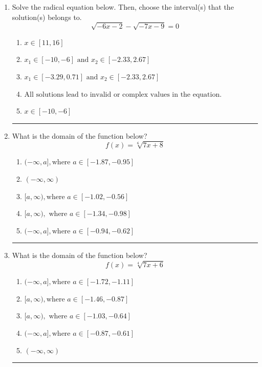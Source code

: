 \documentclass[14pt]{extbook}
\newcommand{\litem}[1]{\item#1\hspace*{-1cm}\rule{\textwidth}{0.4pt}}
\begin{document}
\begin{enumerate}
{\begin{enumerate}[label=\Alph*.]
\end{enumerate} }
\litem{
Solve the radical equation below. Then, choose the interval(s) that the solution(s) belongs to.\[ \sqrt{-6 x - 2} - \sqrt{-7 x - 9} = 0 \]\begin{enumerate}[label=\Alph*.]
\item \( x \in [11,16] \)
\item \( x_1 \in [-10, -6] \text{ and } x_2 \in [-2.33,2.67] \)
\item \( x_1 \in [-3.29, 0.71] \text{ and } x_2 \in [-2.33,2.67] \)
\item \( \text{All solutions lead to invalid or complex values in the equation.} \)
\item \( x \in [-10,-6] \)

\end{enumerate} }
\litem{
What is the domain of the function below?\[ f(x) = \sqrt[6]{7 x + 8} \]\begin{enumerate}[label=\Alph*.]
\item \( (-\infty, a], \text{where } a \in [-1.87, -0.95] \)
\item \( (-\infty, \infty) \)
\item \( [a, \infty), \text{where } a \in [-1.02, -0.56] \)
\item \( [a, \infty), \text{ where } a \in [-1.34, -0.98] \)
\item \( (-\infty, a], \text{where } a \in [-0.94, -0.62] \)

\end{enumerate} }
\litem{
What is the domain of the function below?\[ f(x) = \sqrt[4]{7 x + 6} \]\begin{enumerate}[label=\Alph*.]
\item \( (-\infty, a], \text{where } a \in [-1.72, -1.11] \)
\item \( [a, \infty), \text{where } a \in [-1.46, -0.87] \)
\item \( [a, \infty), \text{ where } a \in [-1.03, -0.64] \)
\item \( (-\infty, a], \text{where } a \in [-0.87, -0.61] \)
\item \( (-\infty, \infty) \)


\end{enumerate}}
\end{enumerate}
\end{document}
